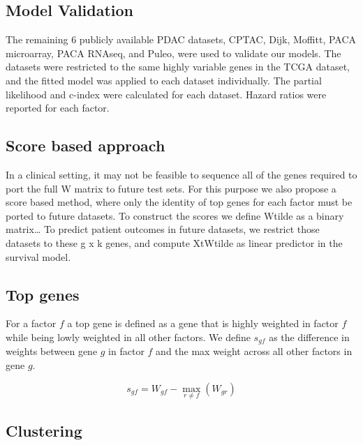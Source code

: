 \documentclass[9pt,twocolumn,twoside,]{pnas-new}
\begin{document}
\subsection*{Model Validation}\label{model-validation}

The remaining 6 publicly available PDAC datasets, CPTAC, Dijk, Moffitt,
PACA microarray, PACA RNAseq, and Puleo, were used to validate our
models. The datasets were restricted to the same highly variable genes
in the TCGA dataset, and the fitted model was applied to each dataset
individually. The partial likelihood and c-index were calculated for
each dataset. Hazard ratios were reported for each factor.

\subsection*{Score based approach}\label{score-based-approach}

In a clinical setting, it may not be feasible to sequence all of the
genes required to port the full W matrix to future test sets. For this
purpose we also propose a score based method, where only the identity of
top genes for each factor must be ported to future datasets. To
construct the scores we define Wtilde as a binary matrix\ldots{} To
predict patient outcomes in future datasets, we restrict those datasets
to these g x k genes, and compute XtWtilde as linear predictor in the
survival model.

\subsection*{Top genes}\label{top-genes}

For a factor \(f\) a top gene is defined as a gene that is highly
weighted in factor \(f\) while being lowly weighted in all other
factors. We define \(s_{gf}\) as the difference in weights between gene
\(g\) in factor \(f\) and the max weight across all other factors in
gene \(g\).

\begin{equation}
s_{gf} = W_{gf} - \max_{r \ne f}(W_{gr})
\end{equation}

\subsection*{Clustering}\label{clustering}
\end{document}
